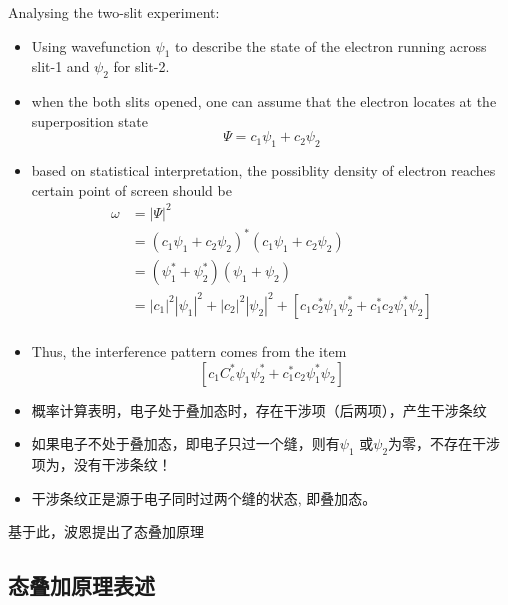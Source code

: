 \begin{frame} [allowframebreaks=]
    Analysing the two-slit experiment:\\
    \begin{itemize}
        \item Using wavefunction $\psi_1$ to describe the state of the electron running across slit-1 and $\psi_2$ for slit-2. \\
        \item when the both slits opened, one can assume that the electron locates at the superposition state
            \[ \Psi=c_1 \psi_1+ c_2\psi_2 \]
        \item based on statistical interpretation, the possiblity density of electron reaches certain point of screen should be
        \begin{equation*}
        \begin{split}
            \omega &=|\Psi|^2 \\
            &= (c_1 \psi_1+ c_2\psi_2)^* (c_1 \psi_1+ c_2\psi_2) \\
            &=(\psi_1^*+\psi_2^*)(\psi_1+\psi_2) \\ 
            & = |c_1|^2 |\psi_1|^2 + |c_2|^2 |\psi_2|^2  + [c_1 c_2 ^* \psi_1 \psi_2 ^* + c_1 ^* c_2 \psi_1 ^* \psi_2] \\
        \end{split} 
        \end{equation*}
        \item Thus, the interference pattern comes from the item  
        \[[c_1 C_c ^* \psi_1 \psi_2 ^* + c_1 ^* c_2 \psi_1 ^* \psi_2] \]
    \end{itemize}
    \begin{itemize}
        \item 概率计算表明，电子处于叠加态时，存在干涉项（后两项），产生干涉条纹
        \item 如果电子不处于叠加态，即电子只过一个缝，则有$\psi_1$ 或$\psi_2$为零，不存在干涉项为，没有干涉条纹！
        \item 干涉条纹正是源于电子同时过两个缝的状态, 即叠加态。
    \end{itemize}
    基于此，波恩提出了态叠加原理
\end{frame}

\subsection{态叠加原理表述}

